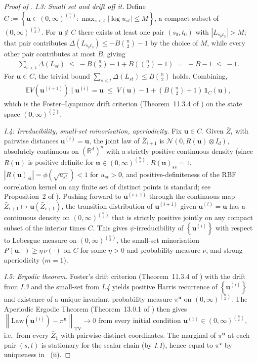 \documentclass{article}
\newcommand{\RR}{\mathbb{R}}
\newcommand{\Abs}[1]{\left| #1 \right|}
\newcommand{\Set}[1]{\left\{ #1 \right\}}
\newcommand{\Brack}[1]{\left( #1 \right)}
\newcommand{\Exp}[1]{\mathbb{E} #1}
\newcommand{\norm}[1]{\left\|#1\right\|}
\newcommand{\cond}{\mid}
\newcommand{\mcN}{\mathcal{N}}
\newcommand{\bZ}{\bar{Z}}
\newcommand{\bv}{\mathbf{v}}
\newcommand{\bu}{\mathbf{u}}
\newcommand{\Law}{\mathrm{Law}}
\begin{document}
\begin{proof}[Proof of ]
  \emph{I.3: Small set and drift off it.} Define $C := \Set{\bu \in (0,\infty)^{\binom{n}{2}} : \max_{s<t} \Abs{\log u_{st}} \le M}$, a compact subset of $(0,\infty)^{\binom{n}{2}}$. For $\bu \notin C$ there exists at least one pair $(s_0, t_0)$ with $\Abs{L_{s_0 t_0}} > M$; that pair contributes $\Delta(L_{s_0 t_0}) \le -B\binom{n}{2} - 1$ by the choice of $M$, while every other pair contributes at most $B$, giving
  \begin{eqnarray*}
    \sum_{s<t} \Delta(L_{st}) \;\le\; -B\binom{n}{2} - 1 + B\Brack{\binom{n}{2} - 1} \;=\; -B - 1 \;\le\; -1.
  \end{eqnarray*}
  For $\bu \in C$, the trivial bound $\sum_{s<t} \Delta(L_{st}) \le B \binom{n}{2}$ holds. Combining,
  \begin{eqnarray*}
    \Exp{V(\bu^{(i+1)}) \cond \bu^{(i)} = \bu} \;\le\; V(\bu) - 1 + \Brack{B\binom{n}{2} + 1}\,\mathbf{1}_C(\bu),
  \end{eqnarray*}
  which is the Foster--Lyapunov drift criterion (Theorem~11.3.4 of \cite{meyn1993markov}) on the state space $(0,\infty)^{\binom{n}{2}}$.

  \emph{I.4: Irreducibility, small-set minorisation, aperiodicity.} Fix $\bu \in C$. Given $\bZ_i$ with pairwise distances $\bu^{(i)} = \bu$, the joint law of $\bZ_{i+1}$ is $\mcN(0, R(\bu) \otimes I_d)$, absolutely continuous on $(\RR^d)^n$ with a strictly positive continuous density (since $R(\bu)$ is positive definite for $\bu \in (0,\infty)^{\binom{n}{2}}$: $R(\bu)_{ss} = 1$, $|R(\bu)_{st}| = \phi(\sqrt{u_{st}}) < 1$ for $u_{st} > 0$, and positive-definiteness of the RBF correlation kernel on any finite set of distinct points is standard; see Proposition~2 of \cite{dunlop2018how}). Pushing forward to $\bu^{(i+1)}$ through the continuous map $\bZ_{i+1} \mapsto \bu(\bZ_{i+1})$, the transition distribution of $\bu^{(i+1)}$ given $\bu^{(i)} = \bu$ has a continuous density on $(0,\infty)^{\binom{n}{2}}$ that is strictly positive jointly on any compact subset of the interior times $C$. This gives $\psi$-irreducibility of $\Set{\bu^{(i)}}$ with respect to Lebesgue measure on $(0,\infty)^{\binom{n}{2}}$, the small-set minorisation $P(\bu, \cdot) \ge \eta\, \nu(\cdot)$ on $C$ for some $\eta > 0$ and probability measure $\nu$, and strong aperiodicity ($m = 1$).

  \emph{I.5: Ergodic theorem.} Foster's drift criterion (Theorem~11.3.4 of \cite{meyn1993markov}) with the drift from \emph{I.3} and the small-set from \emph{I.4} yields positive Harris recurrence of $\Set{\bu^{(i)}}$ and existence of a unique invariant probability measure $\pi^{\bu}$ on $(0,\infty)^{\binom{n}{2}}$. The Aperiodic Ergodic Theorem (Theorem~13.0.1 of \cite{meyn1993markov}) then gives $\norm{\Law(\bu^{(i)}) - \pi^{\bu}}_{\mathrm{TV}} \to 0$ from every initial condition $\bu^{(1)} \in (0,\infty)^{\binom{n}{2}}$, i.e.\ from every $\bZ_1$ with pairwise-distinct coordinates. The marginal of $\pi^{\bu}$ at each pair $(s,t)$ is stationary for the scalar chain (by \emph{I.1}), hence equal to $\pi^{\bv}$ by uniqueness in ~(ii).


\end{proof}
\end{document}
